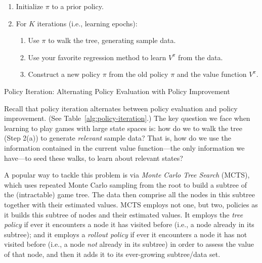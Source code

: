 \documentclass{article}
\begin{document}
\begin{table}[ht!]
\begin{enumerate}
\item Initialize $\pi$ to a prior policy.
 
\item For $K$ iterations (i.e., learning epochs):

\begin{enumerate}
\item Use $\pi$ to walk the tree, generating sample data.

\item Use your favorite regression method to learn $V^\pi$ from the data.

\item Construct a new policy $\pi$ from the old policy $\pi$ and the value function $V^{\pi}$.
\end{enumerate}

\end{enumerate}
\caption{Policy Iteration: Alternating Policy Evaluation with Policy Improvement}
\label{alg:policy-iteration}
\end{table}

Recall that policy iteration alternates between policy evaluation and
policy improvement.  (See Table~\ref{alg:policy-iteration}.)  The key
question we face when learning to play games with large state spaces
is: how do we to walk the tree (Step 2(a)) to generate
\emph{relevant\/} sample data?
That is, how do we use the information contained in the current value
function---the only information we have---to seed these walks, to learn
about relevant states?
 
A popular way to tackle this problem is via \emph{Monte Carlo Tree
  Search} (MCTS), which uses repeated Monte Carlo sampling from the
root to build a subtree of the (intractable) game tree.  The data then
comprise all the nodes in this subtree together with their estimated
values.
MCTS employs not one, but two, policies as it builds this subtree of
nodes and their estimated values.  It employs the \emph{tree policy\/}
if ever it encounters a node it has visited before (i.e., a node
already in its subtree); and it employs a \emph{rollout policy\/} if
ever it encounters a node it has not visited before (i.e., a node
\emph{not\/} already in its subtree) in order to assess the value
of that node, and then it adds it to its ever-growing subtree/data set.
\end{document}
